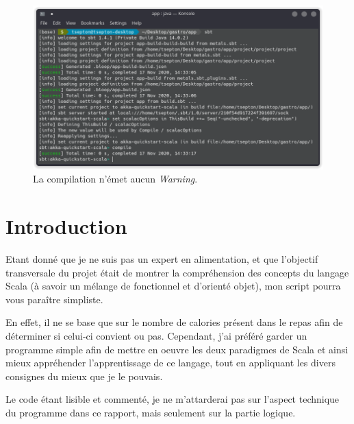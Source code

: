 \vfill
\begin{figure}[H]
    \centering
    \includegraphics[width=1\textwidth]{parts/pics/1.png}
    \caption{La compilation n'émet aucun \textit{Warning}.}
    \label{fig:my_label}
\end{figure}

\newpage
\section{Introduction}
Etant donné que je ne suis pas un expert en alimentation, et que l'objectif transversale du projet 
était de montrer la compréhension des concepts du langage Scala (à savoir un mélange de fonctionnel
et d'orienté objet), mon script pourra vous paraître simpliste. 

En effet, il ne se base que sur le nombre de calories présent dans le repas afin de déterminer si
celui-ci convient ou pas. Cependant, j'ai préféré garder un programme simple afin de mettre en
oeuvre les deux paradigmes de Scala et ainsi mieux appréhender l'apprentissage de ce langage, 
tout en appliquant les divers consignes du mieux que je le pouvais. 

Le code étant lisible et commenté, je ne m'attarderai pas sur l'aspect technique du programme dans
ce rapport, mais seulement sur la partie logique.

